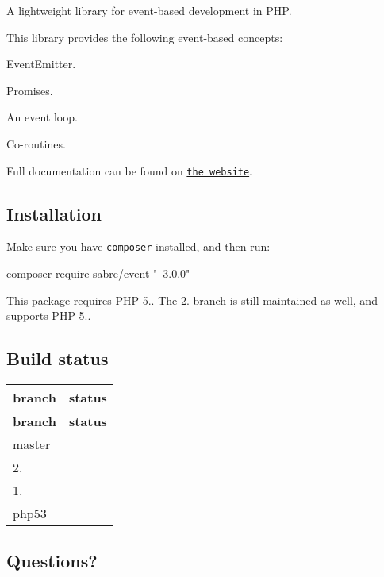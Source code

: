 A lightweight library for event-\/based development in P\+HP.

This library provides the following event-\/based concepts\+:


\begin{DoxyEnumerate}
\item Event\+Emitter.
\item Promises.
\item An event loop.
\item Co-\/routines.
\end{DoxyEnumerate}

Full documentation can be found on \href{http://sabre.io/event/}{\tt the website}.

\subsection*{Installation }

Make sure you have \href{http://getcomposer.org/}{\tt composer} installed, and then run\+: \begin{DoxyVerb}composer require sabre/event "~3.0.0"
\end{DoxyVerb}


This package requires P\+HP 5.. The 2. branch is still maintained as well, and supports P\+HP 5..

\subsection*{Build status }

\tabulinesep=1mm
\begin{longtabu} spread 0pt [c]{*{2}{|X[-1]}|}
\hline
\rowcolor{\tableheadbgcolor}\textbf{ branch  }&\textbf{ status   }\\
\endfirsthead
\hline
\endfoot
\hline
\rowcolor{\tableheadbgcolor}\textbf{ branch  }&\textbf{ status   }\\
\endhead
master  &\href{https://travis-ci.org/fruux/sabre-event}{\tt }   \\
2.  &\href{https://travis-ci.org/fruux/sabre-event}{\tt }   \\
1.  &\href{https://travis-ci.org/fruux/sabre-event}{\tt }   \\
php53  &\href{https://travis-ci.org/fruux/sabre-event}{\tt }   \\
\end{longtabu}


\subsection*{Questions? }


